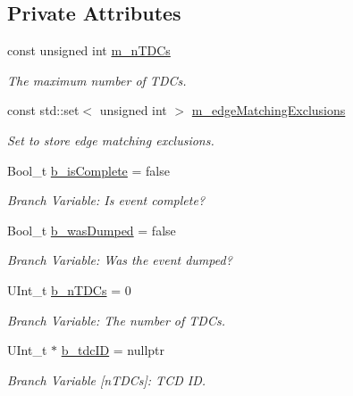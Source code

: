 \subsection*{Private Attributes}
\begin{DoxyCompactItemize}
\item 
const unsigned int \hyperlink{class_event_tree_manager_a87c672aa1531b362b15eddf11cab00c8}{m\+\_\+n\+T\+D\+Cs}
\begin{DoxyCompactList}\small\item\em The maximum number of T\+D\+Cs. \end{DoxyCompactList}\item 
const std\+::set$<$ unsigned int $>$ \hyperlink{class_event_tree_manager_aea70f1feef081fb124517ba8efc4087b}{m\+\_\+edge\+Matching\+Exclusions}
\begin{DoxyCompactList}\small\item\em Set to store edge matching exclusions. \end{DoxyCompactList}\item 
Bool\+\_\+t \hyperlink{class_event_tree_manager_a6e9b9bd6363f95fce295b19cb544ea83}{b\+\_\+is\+Complete} = false
\begin{DoxyCompactList}\small\item\em Branch Variable\+: Is event complete? \end{DoxyCompactList}\item 
Bool\+\_\+t \hyperlink{class_event_tree_manager_ab99e54a6c2d4c59bb073038649b3ae4f}{b\+\_\+was\+Dumped} = false
\begin{DoxyCompactList}\small\item\em Branch Variable\+: Was the event dumped? \end{DoxyCompactList}\item 
U\+Int\+\_\+t \hyperlink{class_event_tree_manager_a8414d85d8ae7c9ea4ae3873c57121749}{b\+\_\+n\+T\+D\+Cs} = 0
\begin{DoxyCompactList}\small\item\em Branch Variable\+: The number of T\+D\+Cs. \end{DoxyCompactList}\item 
U\+Int\+\_\+t $\ast$ \hyperlink{class_event_tree_manager_a0e8cb571dd8ffe1295e9e31ce45c5d82}{b\+\_\+tdc\+ID} = nullptr
\begin{DoxyCompactList}\small\item\em Branch Variable \mbox{[}n\+T\+D\+Cs\mbox{]}\+: T\+CD ID. \end{DoxyCompactList}\item 

\end{DoxyCompactItemize}
